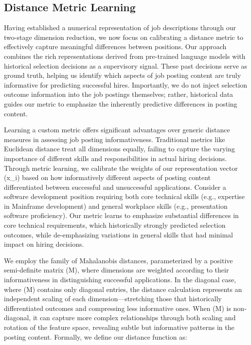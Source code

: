 \subsection{Distance Metric Learning}

Having established a numerical representation of job descriptions through our two-stage dimension reduction, we now focus on calibrating a distance metric to effectively capture meaningful differences between positions. Our approach combines the rich representations derived from pre-trained language models with historical selection decisions as a supervisory signal. These past decisions serve as ground truth, helping us identify which aspects of job posting content are truly informative for predicting successful hires. Importantly, we do not inject selection outcome information into the job postings themselves; rather, historical data guides our metric to emphasize the inherently predictive differences in posting content.

Learning a custom metric offers significant advantages over generic distance measures in assessing job posting informativeness. Traditional metrics like Euclidean distance treat all dimensions equally, failing to capture the varying importance of different skills and responsibilities in actual hiring decisions. Through metric learning, we calibrate the weights of our representation vector (x_i) based on how informatively different aspects of posting content differentiated between successful and unsuccessful applications. Consider a software development position requiring both core technical skills (e.g., expertise in Mainframe development) and general workplace skills (e.g., presentation software proficiency). Our metric learns to emphasize substantial differences in core technical requirements, which historically strongly predicted selection outcomes, while de-emphasizing variations in general skills that had minimal impact on hiring decisions.

We employ the family of Mahalanobis distances, parameterized by a positive semi-definite matrix (M), where dimensions are weighted according to their informativeness in distinguishing successful applications. In the diagonal case, where (M) contains only diagonal entries, the distance calculation represents an independent scaling of each dimension—stretching those that historically differentiated outcomes and compressing less informative ones. When (M) is non-diagonal, it can capture more complex relationships through both scaling and rotation of the feature space, revealing subtle but informative patterns in the posting content. Formally, we define our distance function as:


